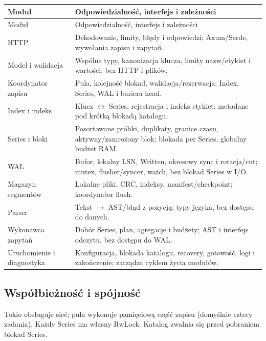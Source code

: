 \documentclass[11pt,a4paper]{article}
\newcommand{\tabhead}[1]{\toprule #1\\ \midrule\endfirsthead
  \toprule #1\\ \midrule\endhead \bottomrule\endfoot}
\begin{document}
\begin{longtable}{P{33mm}P{123mm}}
\tabhead{Moduł & Odpowiedzialność, interfejs i zależności}
HTTP & Dekodowanie, limity, błędy i odpowiedzi; Axum/Serde,
wywołania zapisu i zapytań.\\
Model i walidacja & Wspólne typy, kanonizacja klucza, limity nazw/etykiet
i wartości; bez HTTP i plików.\\
Koordynator zapisu & Pula, kolejność blokad, walidacja/rezerwacja;
Index, Series, WAL i bariera head.\\
Index i indeks & Klucz $\leftrightarrow$ Series, rejestracja i indeks etykiet;
metadane pod krótką blokadą katalogu.\\
Series i bloki & Posortowane próbki, duplikaty, granice czasu, aktywny/zamrożony
blok; blokada per Series, globalny budżet RAM.\\
WAL & Bufor, lokalny LSN, Written, okresowy sync i rotacja/cut;
mutex, flusher/syncer, watch, bez blokad Series w I/O.\\
Magazyn segmentów & Lokalne pliki, CRC, indeksy, manifest/checkpoint;
koordynator flush.\\
Parser & Tekst $\rightarrow$ AST/błąd z pozycją; typy języka,
bez dostępu do danych.\\
Wykonawca zapytań & Dobór Series, plan, agregacje i budżety;
AST i interfejs odczytu, bez dostępu do WAL.\\
Uruchomienie i diagnostyka & Konfiguracja, blokada katalogu, recovery,
gotowość, logi i zakończenie; zarządza cyklem życia modułów.\\
\end{longtable}

\subsection{Współbieżność i spójność}
\label{sec:concurrency}
Tokio obsługuje sieć; pula wykonuje pamięciową część zapisu
(domyślnie cztery zadania). Każdy Series ma własny RwLock.
Katalog zwalnia się przed pobraniem blokad Series.
\end{document}

